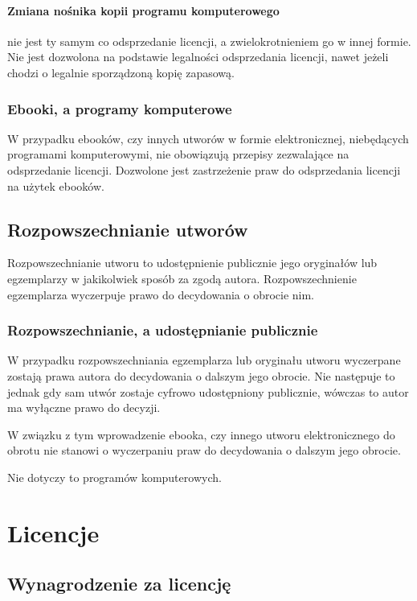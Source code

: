 \documentclass{article}
\begin{document}
\paragraph{Zmiana nośnika kopii programu komputerowego}

nie jest ty samym co odsprzedanie licencji, a zwielokrotnieniem go w innej formie. Nie jest dozwolona na podstawie legalności odsprzedania licencji, nawet jeżeli chodzi o legalnie sporządzoną kopię zapasową.

\subsubsection{Ebooki, a programy komputerowe}

W przypadku ebooków, czy innych utworów w formie elektronicznej, niebędących programami komputerowymi, nie obowiązują przepisy zezwalające na odsprzedanie licencji. Dozwolone jest zastrzeżenie praw do odsprzedania licencji na użytek ebooków.

\subsection{Rozpowszechnianie utworów}

Rozpowszechnianie utworu to udostępnienie publicznie jego oryginałów lub egzemplarzy w jakikolwiek sposób za zgodą autora. Rozpowszechnienie egzemplarza wyczerpuje prawo do decydowania o obrocie nim.

\subsubsection{Rozpowszechnianie, a udostępnianie publicznie}

W przypadku rozpowszechniania egzemplarza lub oryginału utworu wyczerpane zostają prawa autora do decydowania o dalszym jego obrocie.
Nie następuje to jednak gdy sam utwór zostaje cyfrowo udostępniony publicznie, wówczas to autor ma wyłączne prawo do decyzji.

W związku z tym wprowadzenie ebooka, czy innego utworu elektronicznego do obrotu nie stanowi o wyczerpaniu praw do decydowania o dalszym jego obrocie.

Nie dotyczy to programów komputerowych.

\section{Licencje}

\subsection{Wynagrodzenie za licencję}
\end{document}
